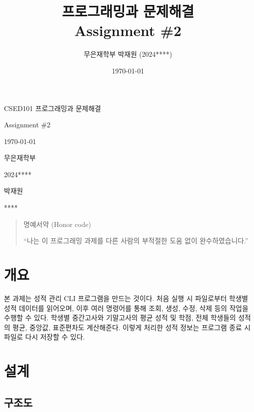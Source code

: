 \documentclass{article}
\title{프로그래밍과 문제해결 \\ Assignment \#2}
\author{무은재학부 박재원 (2024****)}
\date{\today}
\begin{document}
\begin{titlepage}
	\centering
	{\huge CSED101 프로그래밍과 문제해결\par}
	\vspace{0.5cm}
	{\LARGE Assignment \#2\par}
	\vspace{0.5cm}
	{\large \today\par}
	\vfill
  
  \begin{multicols}{2}
    \vphantom{}
    \columnbreak
  {
    \Large 
    \begin{description}[nosep, align=right, labelwidth=\widthof{00000000000000000}]
      \item[학과] 무은재학부
      \item[학번] 2024****
      \item[이름] 박재원
      \item[POVIS ID] ****
    \end{description}
  }
  \end{multicols}

  \vspace{1cm}


  \begin{quote}
    명예서약 (Honor code)

    ``나는 이 프로그래밍 과제를 다른 사람의 부적절한 도움 없이 완수하였습니다.''
  \end{quote}

\end{titlepage}

\tableofcontents

\section{개요}

본 과제는 성적 관리 CLI 프로그램을 만드는 것이다.
처음 실행 시 파일로부터 학생별 성적 데이터를 읽어오며,
이후 여러 명령어를 통해 조회, 생성, 수정, 삭제 등의 작업을 수행할 수 있다.
학생별 중간고사와 기말고사의 평균 성적 및 학점, 전체 학생들의 성적의 평균, 중앙값, 표준편차도 계산해준다.
이렇게 처리한 성적 정보는 프로그램 종료 시 파일로 다시 저장할 수 있다.

\section{설계}

\subsection{구조도}
\end{document}
